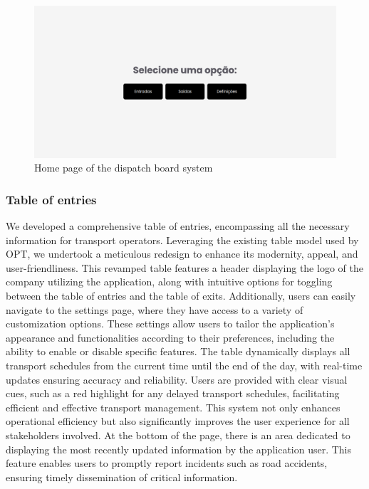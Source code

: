 \documentclass[10pt]{article}
\begin{document}
        \begin{figure}[h]
            \centering
            \includegraphics[width=1\textwidth]{home_page}
            \caption{Home page of the dispatch board system}
            \label{fig:home_page}
        \end{figure}

        \subsubsection{Table of entries}

        We developed a comprehensive table of entries, encompassing all the necessary information for transport operators. Leveraging the existing table model used by OPT, we undertook a meticulous redesign to enhance its modernity, appeal, and user-friendliness. This revamped table features a header displaying the logo of the company utilizing the application, along with intuitive options for toggling between the table of entries and the table of exits.
        Additionally, users can easily navigate to the settings page, where they have access to a variety of customization options. These settings allow users to tailor the application's appearance and functionalities according to their preferences, including the ability to enable or disable specific features.
        The table dynamically displays all transport schedules from the current time until the end of the day, with real-time updates ensuring accuracy and reliability. Users are provided with clear visual cues, such as a red highlight for any delayed transport schedules, facilitating efficient and effective transport management. This system not only enhances operational efficiency but also significantly improves the user experience for all stakeholders involved.
        At the bottom of the page, there is an area dedicated to displaying the most recently updated information by the application user. This feature enables users to promptly report incidents such as road accidents, ensuring timely dissemination of critical information.
\end{document}
